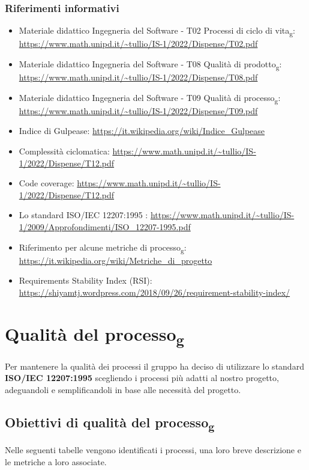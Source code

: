 \subsubsection{Riferimenti informativi}
\begin{itemize}
	\item Materiale didattico Ingegneria del Software - T02 Processi di ciclo di vita\textsubscript{g}: \url{https://www.math.unipd.it/~tullio/IS-1/2022/Dispense/T02.pdf}
	\item Materiale didattico Ingegneria del Software - T08 Qualità di prodotto\textsubscript{g}: \url{https://www.math.unipd.it/~tullio/IS-1/2022/Dispense/T08.pdf}
	\item Materiale didattico Ingegneria del Software - T09 Qualità di processo\textsubscript{g}: \url{https://www.math.unipd.it/~tullio/IS-1/2022/Dispense/T09.pdf}
	\item Indice di Gulpease: \url{https://it.wikipedia.org/wiki/Indice_Gulpease}
	\item Complessità ciclomatica: \url{https://www.math.unipd.it/~tullio/IS-1/2022/Dispense/T12.pdf}
	\item Code coverage: \url{https://www.math.unipd.it/~tullio/IS-1/2022/Dispense/T12.pdf}	
	\item Lo standard ISO/IEC 12207:1995 : \url{https://www.math.unipd.it/~tullio/IS-1/2009/Approfondimenti/ISO_12207-1995.pdf}
	\item Riferimento per alcune metriche di processo\textsubscript{g}: \url{https://it.wikipedia.org/wiki/Metriche_di_progetto}
	\item Requirements Stability Index (RSI): \\ \url{https://shiyamtj.wordpress.com/2018/09/26/requirement-stability-index/}
\end{itemize}

\section{Qualità del processo\textsubscript{g}}
Per mantenere la qualità dei processi il gruppo ha deciso di utilizzare lo standard \textbf{ISO/IEC 12207:1995} scegliendo i processi più adatti al nostro progetto, adeguandoli e semplificandoli in base alle necessità del progetto.

\subsection{Obiettivi di qualità del processo\textsubscript{g}}
Nelle seguenti tabelle vengono identificati i processi, una loro breve descrizione e le metriche a loro associate. 
